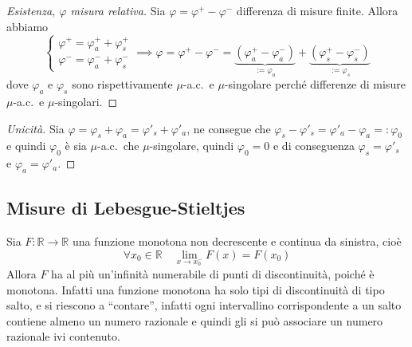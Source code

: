 \begin{proof}[Esistenza, \(\varphi \) misura relativa] Sia \(\varphi  = \varphi
    ^{+} - \varphi ^{-}\) differenza di misure finite. Allora abbiamo
    \[
        \begin{cases}
            \varphi^{+} = \varphi^{+}_a + \varphi^{+}_s \\
            \varphi^{-} = \varphi^{-}_a + \varphi^{-}_s
        \end{cases}
        \implies \varphi = \varphi^{+} - \varphi ^{-} = \underbrace{(\varphi ^{+}_a -
        \varphi ^{-}_a)}_{:=\varphi_a} + \underbrace{(\varphi ^{+}_s - \varphi
    ^{-}_s)}_{:=\varphi_s}
    \]
    dove \(\varphi_a\) e \(\varphi_s\) sono rispettivamente \(\mu\)-a.c.~e
    \(\mu\)-singolare perché differenze di misure \(\mu\)-a.c.~e \(\mu\)-singolari.
\end{proof}

\begin{proof}[Unicità]
    Sia \(\varphi = \varphi_s + \varphi_a = \varphi'_s + \varphi'_a\), ne
    consegue che \(\varphi_s - \varphi'_s = \varphi'_a - \varphi_a =:
    \varphi_0\) e quindi \(\varphi_0\) è sia \(\mu\)-a.c.~che \(\mu\)-singolare,
    quindi \(\varphi_0 = 0\) e di conseguenza \(\varphi_s = \varphi'_s\) e
    \(\varphi_a = \varphi'_a\).
\end{proof}

\subsection{Misure di Lebesgue-Stieltjes}
Sia \(F : \mathbb{R} \to \mathbb{R}\) una funzione monotona non decrescente e
continua da sinistra, cioè 
\[
    \forall x_{0} \in \mathbb{R} \quad \lim_{x \to x_{0}^{-}} F{(x)} = F{(x_{0})}
\]
Allora \(F\) ha al più un'infinità numerabile di punti di discontinuità, poiché
è monotona. Infatti una funzione monotona ha solo tipi di discontinuità di tipo
salto, e si riescono a ``contare'', infatti ogni intervallino corrispondente a
un salto contiene almeno un numero razionale e quindi gli si può associare un
numero razionale ivi contenuto.

